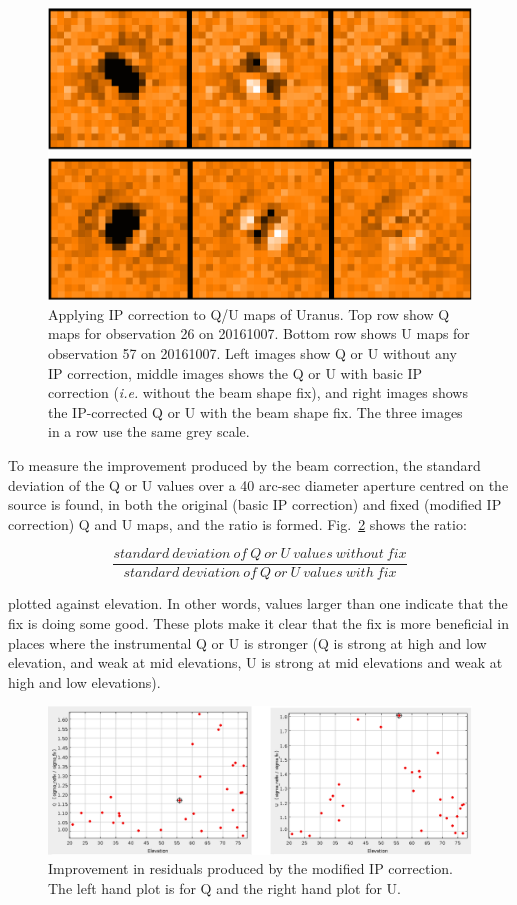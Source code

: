 \documentclass[twoside,11pt]{starlink}
\begin{document}
\begin{itemize}
\begin{figure}
\includegraphics[width=\columnwidth]{ip3}
\caption{Applying IP correction to Q/U maps of Uranus. Top row show Q
maps for observation 26 on 20161007. Bottom row shows U maps for
observation 57 on 20161007. Left images show Q or U without any IP
correction, middle images shows the Q or U with basic IP correction
(\emph{i.e.} without the beam shape fix), and right images shows
the IP-corrected Q or U with the beam shape fix. The three images in
a row use the same grey scale. }
\label{fig:ip3}
\end{figure}

To measure the improvement produced by the beam correction, the standard
deviation of the Q or U values over a 40 arc-sec diameter aperture
centred on the source is found, in both the original (basic IP
correction) and fixed (modified IP correction) Q and U maps, and the
ratio is formed. Fig.~\ref{fig:ip4} shows the ratio:

\[ \frac{standard\ deviation\ of\ Q\ or\ U\ values\ without\ fix}{standard\ deviation\ of\ Q\ or\ U\ values\ with\ fix} \]

plotted against elevation. In other words, values larger than one
indicate that the fix is doing some good. These plots make it clear that
the fix is more beneficial in places where the instrumental Q or U is
stronger (Q is strong at high and low elevation, and weak at mid
elevations, U is strong at mid elevations and weak at high and low
elevations).

\begin{figure}
\includegraphics[width=\columnwidth]{ip4}
\caption{Improvement in residuals produced by the modified IP correction.
The left hand plot is for Q and the right hand plot for U.}
\label{fig:ip4}
\end{figure}


\end{itemize}
\end{document}
